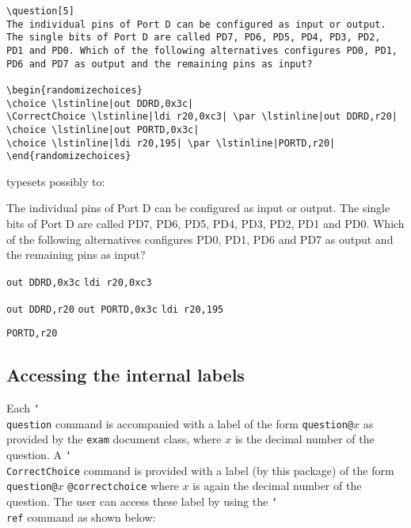 \documentclass[12pt,a4paper]{exam}
\providecommand{\texorpdfstring}[2]{#1}
\newcommand{\bs}{\texorpdfstring{\char`\\}{}}
\begin{document}
\begin{lstlisting}
\question[5]
The individual pins of Port D can be configured as input or output.
The single bits of Port D are called PD7, PD6, PD5, PD4, PD3, PD2,
PD1 and PD0. Which of the following alternatives configures PD0, PD1,
PD6 and PD7 as output and the remaining pins as input?

\begin{randomizechoices}
\choice \lstinline|out DDRD,0x3c|
\CorrectChoice \lstinline|ldi r20,0xc3| \par \lstinline|out DDRD,r20|
\choice \lstinline|out PORTD,0x3c|
\choice \lstinline|ldi r20,195| \par \lstinline|PORTD,r20|
\end{randomizechoices}
\end{lstlisting}

typesets possibly to:

\begin{questions}
\setlength{\parskip}{0pt}
\setcounter{question}{8}
\question[5]
The individual pins of Port D can be configured as input or output. The single bits
of Port D are called PD7, PD6, PD5, PD4, PD3, PD2, PD1 and PD0. Which of the
following alternatives configures PD0, PD1, PD6 and PD7 as output and the remaining
pins as input?


\hspace*{\baselineskip}

\begin{randomizechoices}[norandomize]
	\choice \lstinline|out DDRD,0x3c|
	\CorrectChoice \lstinline|ldi r20,0xc3| \par \lstinline|out DDRD,r20|
    \choice \lstinline|out PORTD,0x3c|
	\choice \lstinline|ldi r20,195| \par \lstinline|PORTD,r20|
\end{randomizechoices}
\end{questions}

\subsection{Accessing the internal labels}
Each \texttt{\bs question} command is accompanied with a label of the form
\texttt{question@}$x$ as provided by the \texttt{exam} document class, where
$x$ is the decimal number of the question. A \texttt{\bs CorrectChoice}
command is provided with a label (by this package) of the form \linebreak \texttt{question@}$x$%
\texttt{@correctchoice} where $x$ is again the decimal number of the question.
The user can access these label by using the \texttt{\bs ref} command as shown
below:
\end{document}
